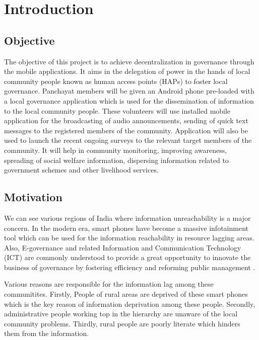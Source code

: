 \chapter{Introduction}


\section{Objective}
The objective of  this project is to achieve decentralization in governance through the mobile applications. It aims in the delegation of power in the hands of local community people known as human access points (HAPs) to foster local governance. Panchayat members will be given an Android phone pre-loaded with a local governance application which is used for the dissemination of information to the local community people. These volunteers will use installed mobile application for the broadcasting of audio announcements, sending of quick text messages to the registered members of the community. Application will also be used to launch the recent ongoing surveys to the relevant target members of the community. It will help in community monitoring, improving awareness, spreading of social welfare information, dispersing information related to government schemes and other livelihood services.

\section{Motivation}
We can see various regions of India where information unreachability is a major concern. In the modern era, smart phones have  become a massive infotainment tool which can be used for the information reachability in resource lagging areas. Also, E-governance and related Information and Communication Technology (ICT) are commonly understood to provide a great opportunity to innovate the business of governance by fostering efficiency and reforming public management \cite{ict1}.

Various reasons are responsible for the information lag among these communitites. Firstly, People of rural areas are deprived of these smart phones which is the key reason of information deprivation among these people. Secondly, administrative people working top in the hierarchy are unaware of the local community problems. Thirdly, rural people are poorly literate which hinders them from the information. 

